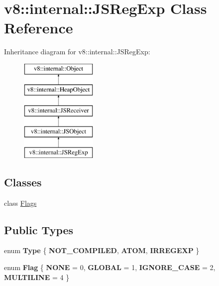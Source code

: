 \hypertarget{classv8_1_1internal_1_1_j_s_reg_exp}{}\section{v8\+:\+:internal\+:\+:J\+S\+Reg\+Exp Class Reference}
\label{classv8_1_1internal_1_1_j_s_reg_exp}
Inheritance diagram for v8\+:\+:internal\+:\+:J\+S\+Reg\+Exp\+:\begin{figure}[H]
\begin{center}
\leavevmode
\includegraphics[height=5.000000cm]{classv8_1_1internal_1_1_j_s_reg_exp}
\end{center}
\end{figure}
\subsection*{Classes}
\begin{DoxyCompactItemize}
\item 
class \hyperlink{classv8_1_1internal_1_1_j_s_reg_exp_1_1_flags}{Flags}
\end{DoxyCompactItemize}
\subsection*{Public Types}
\begin{DoxyCompactItemize}
\item 
\hypertarget{classv8_1_1internal_1_1_j_s_reg_exp_a4f505066a55b1fa40937655595e04152}{}enum {\bfseries Type} \{ {\bfseries N\+O\+T\+\_\+\+C\+O\+M\+P\+I\+L\+E\+D}, 
{\bfseries A\+T\+O\+M}, 
{\bfseries I\+R\+R\+E\+G\+E\+X\+P}
 \}\label{classv8_1_1internal_1_1_j_s_reg_exp_a4f505066a55b1fa40937655595e04152}

\item 
\hypertarget{classv8_1_1internal_1_1_j_s_reg_exp_a3fe304d5d9269091f2a4f33eee1af177}{}enum {\bfseries Flag} \{ {\bfseries N\+O\+N\+E} = 0, 
{\bfseries G\+L\+O\+B\+A\+L} = 1, 
{\bfseries I\+G\+N\+O\+R\+E\+\_\+\+C\+A\+S\+E} = 2, 
{\bfseries M\+U\+L\+T\+I\+L\+I\+N\+E} = 4
 \}\label{classv8_1_1internal_1_1_j_s_reg_exp_a3fe304d5d9269091f2a4f33eee1af177}

\end{DoxyCompactItemize}
